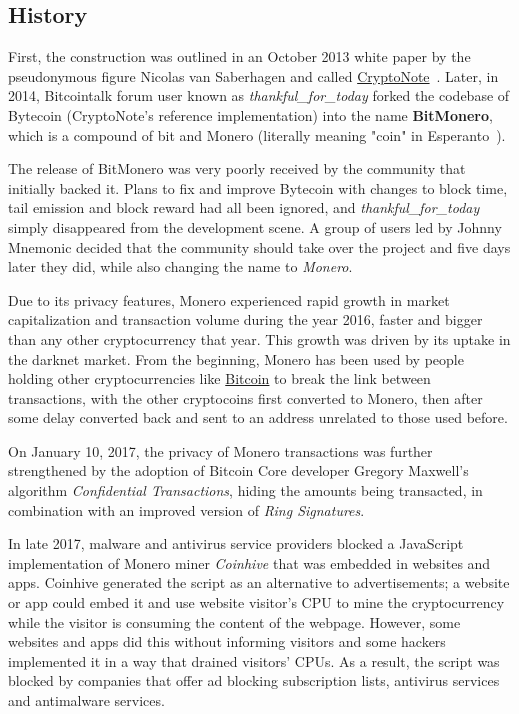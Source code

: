 \subsection{History}
First, the construction was outlined in an October 2013 white paper by the pseudonymous figure Nicolas van Saberhagen and called \hyperref[sec:CryptoNote]{CryptoNote}~\cite{citeulike:14139412}. Later, in 2014, Bitcointalk forum user known as \emph{thankful\_for\_today} forked the codebase of Bytecoin (CryptoNote's reference implementation) into the name \textbf{BitMonero}, which is a compound of bit and Monero (literally meaning "coin" in Esperanto~\cite{esperanto}).

The release of BitMonero was very poorly received by the community that initially backed it. Plans to fix and improve Bytecoin with changes to block time, tail emission and block reward had all been ignored, and \emph{thankful\_for\_today} simply disappeared from the development scene. A group of users led by Johnny Mnemonic decided that the community should take over the project and five days later they did, while also changing the name to \emph{Monero}.

Due to its privacy features, Monero experienced rapid growth in market capitalization and transaction volume during the year 2016, faster and bigger than any other cryptocurrency that year. This growth was driven by its uptake in the darknet market. From the beginning, Monero has been used by people holding other cryptocurrencies like \hyperref[sec:Bitcoin]{Bitcoin} to break the link between transactions, with the other cryptocoins first converted to Monero, then after some delay converted back and sent to an address unrelated to those used before.

On January 10, 2017, the privacy of Monero transactions was further strengthened by the adoption of Bitcoin Core developer Gregory Maxwell's algorithm \emph{Confidential Transactions}, hiding the amounts being transacted, in combination with an improved version of \emph{Ring Signatures}.

In late 2017, malware and antivirus service providers blocked a JavaScript implementation of Monero miner \emph{Coinhive} that was embedded in websites and apps. Coinhive generated the script as an alternative to advertisements; a website or app could embed it and use website visitor's CPU to mine the cryptocurrency while the visitor is consuming the content of the webpage. However, some websites and apps did this without informing visitors and some hackers implemented it in a way that drained visitors' CPUs. As a result, the script was blocked by companies that offer ad blocking subscription lists, antivirus services and antimalware services.

